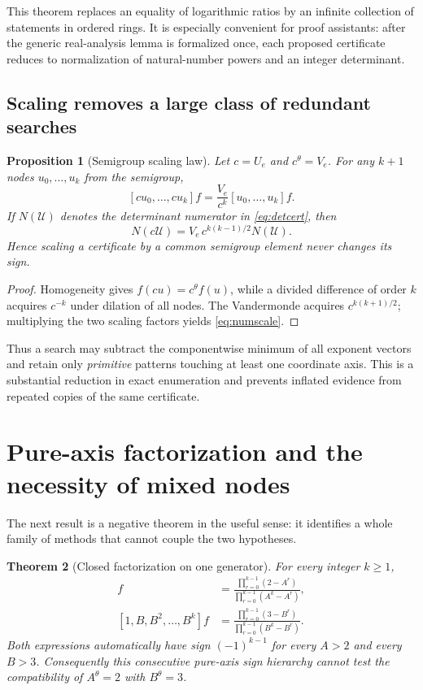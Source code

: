 \documentclass[11pt]{article}
\newtheorem{theorem}{Theorem}[section]
\newtheorem{proposition}[theorem]{Proposition}
\theoremstyle{definition}
\theoremstyle{remark}
\newcommand{\UU}{\mathcal U}
\begin{document}
This theorem replaces an equality of logarithmic ratios by an infinite collection of
statements in ordered rings.  It is especially convenient for proof assistants: after the
generic real-analysis lemma is formalized once, each proposed certificate reduces to
normalization of natural-number powers and an integer determinant.

\subsection{Scaling removes a large class of redundant searches}

\begin{proposition}[Semigroup scaling law]\label{prop:scaling}
Let $c=U_e$ and $c^\theta=V_e$.  For any $k+1$ nodes $u_0,\ldots,u_k$ from the semigroup,
\[
 [cu_0,\ldots,cu_k]f=\frac{V_e}{c^k}[u_0,\ldots,u_k]f.
\]
If $N(\UU)$ denotes the determinant numerator in \eqref{eq:detcert}, then
\begin{equation}\label{eq:numscale}
 N(c\UU)=V_e\,c^{k(k-1)/2}N(\UU).
\end{equation}
Hence scaling a certificate by a common semigroup element never changes its sign.
\end{proposition}

\begin{proof}
Homogeneity gives $f(cu)=c^\theta f(u)$, while a divided difference of order $k$ acquires
$c^{-k}$ under dilation of all nodes.  The Vandermonde acquires
$c^{k(k+1)/2}$; multiplying the two scaling factors yields \eqref{eq:numscale}.
\end{proof}

Thus a search may subtract the componentwise minimum of all exponent vectors and retain only
\emph{primitive} patterns touching at least one coordinate axis.  This is a substantial
reduction in exact enumeration and prevents inflated evidence from repeated copies of the
same certificate.

\section{Pure-axis factorization and the necessity of mixed nodes}

The next result is a negative theorem in the useful sense: it identifies a whole family of
methods that cannot couple the two hypotheses.

\begin{theorem}[Closed factorization on one generator]\label{thm:axis}
For every integer $k\ge1$,
\begin{align}
 [1,A,A^2,\ldots,A^k]f
 &=\frac{\displaystyle\prod_{r=0}^{k-1}(2-A^r)}
 {\displaystyle\prod_{r=0}^{k-1}(A^k-A^r)},\label{eq:Aaxis}\\
 [1,B,B^2,\ldots,B^k]f
 &=\frac{\displaystyle\prod_{r=0}^{k-1}(3-B^r)}
 {\displaystyle\prod_{r=0}^{k-1}(B^k-B^r)}.\label{eq:Baxis}
\end{align}
Both expressions automatically have sign $(-1)^{k-1}$ for every $A>2$ and every $B>3$.
Consequently this consecutive pure-axis sign hierarchy cannot test the compatibility of
$A^\theta=2$ with $B^\theta=3$.
\end{theorem}
\end{document}
